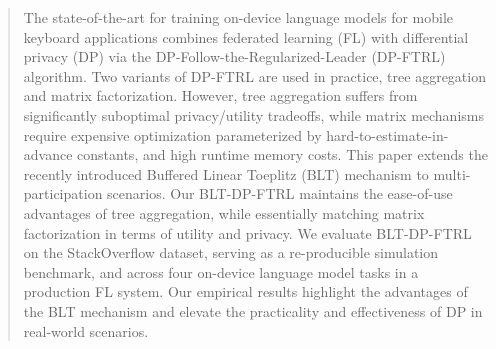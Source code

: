 \begin{abstract}

The state-of-the-art for training on-device language models for mobile keyboard applications combines federated learning (FL) with differential privacy (DP) via the DP-Follow-the-Regularized-Leader (DP-FTRL) algorithm. Two variants of DP-FTRL are used in practice, tree aggregation and matrix factorization. However, tree aggregation suffers from significantly suboptimal privacy/utility tradeoffs, while matrix mechanisms require expensive optimization parameterized by hard-to-estimate-in-advance constants, and high runtime memory costs.
This paper extends the recently introduced Buffered Linear Toeplitz (BLT) mechanism to multi-participation scenarios. Our BLT-DP-FTRL maintains the ease-of-use advantages of tree aggregation, while essentially matching matrix factorization in terms of utility and privacy. 
We evaluate BLT-DP-FTRL on the StackOverflow dataset, serving as a re-producible simulation benchmark, and across four on-device language model tasks in a production FL system. Our empirical results highlight the advantages of the BLT mechanism and elevate the practicality and effectiveness of DP in real-world scenarios. 

\end{abstract}